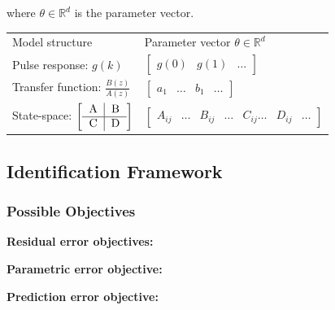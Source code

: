 \documentclass[10pt,a4paper]{scrartcl}
\begin{document}
\begin{multicols*}{2}

where $\theta \in\mathbb{R}^d$ is the parameter vector.

\begin{center}
\begin{tabular}{ll}
Model structure&Parameter vector $\theta\in\mathbb{R}^d$\\
Pulse response: $g(k)$&$\begin{bmatrix}g(0)&g(1)&\ldots\end{bmatrix}$\\
Transfer function: $\frac{B(z)}{A(z)}$&$\begin{bmatrix} a_1&\ldots&b_1&\ldots\end{bmatrix}$\\
State-space: $\left[\begin{tabular} {c|c} A & B\\ \hline  C & D\end{tabular}\right]$&$\begin{bmatrix}A_{ij}&\ldots&B_{ij}&\ldots&C_{ij}\ldots&D_{ij}&\ldots\end{bmatrix}$
\end{tabular}
\end{center}

\subsection{Identification Framework}




\subsubsection{Possible Objectives}

\textbf{Residual error objectives:}



\textbf{Parametric error objective:}


\textbf{Prediction error objective:}


\end{multicols*}
\end{document}
